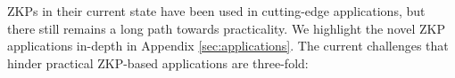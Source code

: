 



ZKPs in their current state have been used in cutting-edge applications, but there still remains a long path towards practicality. We highlight the novel ZKP applications in-depth in Appendix \ref{sec:applications}. The current challenges that hinder practical ZKP-based applications are three-fold:

